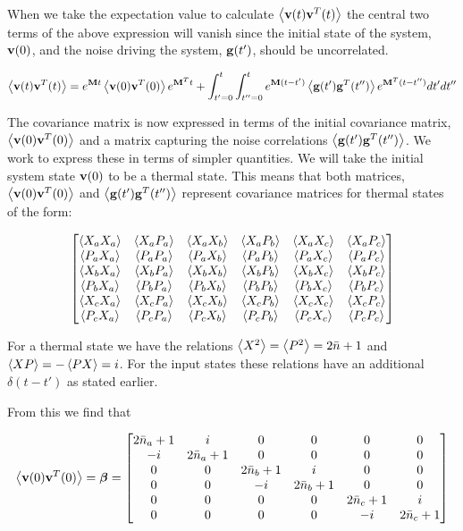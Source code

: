 \documentclass[12pt]{article}
\newcommand{\bv}[1]{\bold{#1}}
\begin{document}
When we take the expectation value to calculate $\Braket{\bv{v}(t)\bv{v}^T(t)}$ the central two terms of the above expression will vanish since the initial state of the system, $\bv{v}(0)$, and the noise driving the system, $\bv{g}(t')$, should be uncorrelated.


\[
\Braket{\bv{v}(t)\bv{v}^T(t)} = e^{\bv{M}t} \Braket{\bv{v}(0)\bv{v}^T(0)}e^{\bv{M}^T t} + \int_{t'=0}^t \int_{t''=0}^t e^{\bv{M}(t-t')} \Braket{\bv{g}(t')\bv{g}^T(t'')} e^{\bv{M}^T (t-t'')} dt' dt''
\]

The covariance matrix is now expressed in terms of the initial covariance matrix, $\Braket{\bv{v}(0)\bv{v}^T(0)}$ and a matrix capturing the noise correlations $\Braket{\bv{g}(t')\bv{g}^T(t'')}$. We work to express these in terms of simpler quantities. We will take the initial system state $\bv{v}(0)$ to be a thermal state. This means that both matrices,  $\Braket{\bv{v}(0)\bv{v}^T(0)}$ and $\Braket{\bv{g}(t')\bv{g}^T(t'')}$ represent covariance matrices for thermal states of the form:

\begin{equation}
\begin{bmatrix}
\Braket{X_a X_a} & \Braket{X_a P_a} & \Braket{X_a X_b} & \Braket{X_a P_b} & \Braket{X_a X_c} & \Braket{X_a P_c}\\
\Braket{P_a X_a} & \Braket{P_a P_a} & \Braket{P_a X_b} & \Braket{P_a P_b} & \Braket{P_a X_c} & \Braket{P_a P_c}\\
\Braket{X_b X_a} & \Braket{X_b P_a} & \Braket{X_b X_b} & \Braket{X_b P_b} & \Braket{X_b X_c} & \Braket{X_b P_c}\\
\Braket{P_b X_a} & \Braket{P_b P_a} & \Braket{P_b X_b} & \Braket{P_b P_b} & \Braket{P_b X_c} & \Braket{P_b P_c}\\
\Braket{X_c X_a} & \Braket{X_c P_a} & \Braket{X_c X_b} & \Braket{X_c P_b} & \Braket{X_c X_c} & \Braket{X_c P_c}\\
\Braket{P_c X_a} & \Braket{P_c P_a} & \Braket{P_c X_b} & \Braket{P_c P_b} & \Braket{P_c X_c} & \Braket{P_c P_c}\\
\end{bmatrix}
\end{equation}

For a thermal state we have the relations $\Braket{X^2} = \Braket{P^2} = 2\bar{n}+1$ and $\Braket{XP} = -\Braket{PX} = i$. For the input states these relations have an additional $\delta(t-t')$ as stated earlier.

From this we find that 

\begin{equation}
\Braket{\bv{v}(0)\bv{v}^T(0)}=\boldsymbol{\beta} = 
\begin{bmatrix}
2\bar{n}_a+1 & i & 0 & 0 & 0 & 0\\
-i & 2\bar{n}_a+1 & 0 & 0 & 0 & 0\\
0 & 0 & 2\bar{n}_b+1 & i & 0 & 0\\
0 & 0 & -i & 2\bar{n}_b+1 & 0 & 0\\
0 & 0 & 0 & 0 & 2\bar{n}_c+1 & i\\
0 & 0 & 0 & 0 & -i & 2\bar{n}_c+1\\
\end{bmatrix}
\end{equation}
\end{document}
